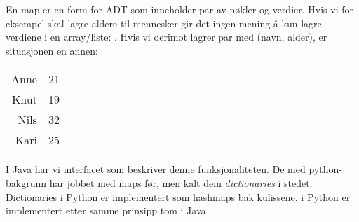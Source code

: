 En map er en form for ADT som inneholder par av nøkler og verdier. Hvis vi for eksempel skal lagre aldere til mennesker gir det ingen mening å kun lagre verdiene i en array/liste: \mono{[21, 19, 32, 25]}. Hvis vi derimot lagrer par med (navn, alder), er situasjonen en annen:
\begin{center}
	\begin{tabular}{r l}
		Anne & 21 \\
		Knut & 19 \\
		Nils & 32 \\
		Kari & 25
	\end{tabular}
\end{center}
I Java har vi interfacet  som beskriver denne funksjonaliteten. De med python-bakgrunn har jobbet med maps før, men kalt dem \textit{dictionaries} i stedet. Dictionaries i Python er implementert som hashmaps bak kulissene.  i Python er implementert etter samme prinsipp tom  i Java

